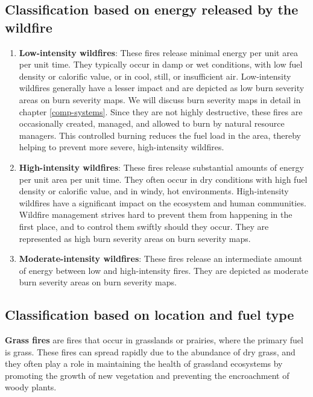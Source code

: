 \documentclass[
  12 pt,
]{Nemilov}
\begin{document}
\subsection{Classification based on energy released by the wildfire}\label{classification-based-on-energy-released-by-the-wildfire}

\begin{enumerate}
\def\labelenumi{\arabic{enumi}.}
\item
  \textbf{Low-intensity wildfires}: These fires release minimal energy per unit area per unit time. They typically occur in damp or wet conditions, with low fuel density or calorific value, or in cool, still, or insufficient air. Low-intensity wildfires generally have a lesser impact and are depicted as low burn severity areas on burn severity maps. We will discuss burn severity maps in detail in chapter \ref{comp-systems}. Since they are not highly destructive, these fires are occasionally created, managed, and allowed to burn by natural resource managers. This controlled burning reduces the fuel load in the area, thereby helping to prevent more severe, high-intensity wildfires.
\item
  \textbf{High-intensity wildfires}: These fires release substantial amounts of energy per unit area per unit time. They often occur in dry conditions with high fuel density or calorific value, and in windy, hot environments. High-intensity wildfires have a significant impact on the ecosystem and human communities. Wildfire management strives hard to prevent them from happening in the first place, and to control them swiftly should they occur. They are represented as high burn severity areas on burn severity maps.
\item
  \textbf{Moderate-intensity wildfires}: These fires release an intermediate amount of energy between low and high-intensity fires. They are depicted as moderate burn severity areas on burn severity maps.
\end{enumerate}

\subsection{Classification based on location and fuel type}\label{classification-based-on-location-and-fuel-type}

\textbf{Grass fires} are fires that occur in grasslands or prairies, where the primary fuel is grass. These fires can spread rapidly due to the abundance of dry grass, and they often play a role in maintaining the health of grassland ecosystems by promoting the growth of new vegetation and preventing the encroachment of woody plants.
\end{document}
